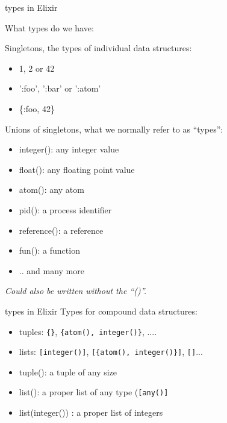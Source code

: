 \begin{frame}{types in Elixir}

What types do we have:

\pause\vspace{10pt}
Singletons, the types of individual data structures:
\begin{itemize}
\item  1, 2 or 42
\item ':foo', ':bar' or ':atom'
\item  \{:foo, 42\}
\end{itemize}
\pause\vspace{10pt}
Unions of singletons, what we normally refer to as ``types'':
\begin{itemize}
\item integer(): any integer value 
\item float(): any floating point value 
\item atom(): any atom 
\item pid(): a process identifier
\item reference(): a reference
\item fun(): a function 
\item .. and many more
\end{itemize}

{\em Could also be written without the ``()''. }
\end{frame}

\begin{frame}{types in Elixir}
Types for compound data structures:
\pause\vspace{10pt}
\begin{itemize}
\item  tuples: {\tt \{\}}, {\tt \{atom(), integer()\}}, ....
\item  lists: {\tt [integer()]}, {\tt [\{atom(), integer()\}]}, {\tt []}... \pause
\end{itemize}

\begin{itemize}
\item  tuple(): a tuple of any size \pause
\item  list(): a proper list of any type ({\tt [any()]} \pause
\item  list(integer()) : a proper list of integers \pause
\end{itemize} \pause

\end{frame}


